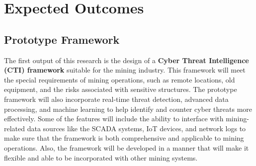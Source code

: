 \documentclass[a4paper,twoside,12pt]{report}
\begin{document}
\section{Expected Outcomes}
\subsection{Prototype Framework}
The first output of this research is the design of a \textbf{Cyber Threat Intelligence (CTI) framework} suitable for the mining industry. This framework will meet the special requirements of mining operations, such as remote locations, old equipment, and the risks associated with sensitive structures. The prototype framework will also incorporate real-time threat detection, advanced data processing, and machine learning to help identify and counter cyber threats more effectively. Some of the features will include the ability to interface with mining-related data sources like the SCADA systems, IoT devices, and network logs to make sure that the framework is both comprehensive and applicable to mining operations. Also, the framework will be developed in a manner that will make it flexible and able to be incorporated with other mining systems.
\end{document}
